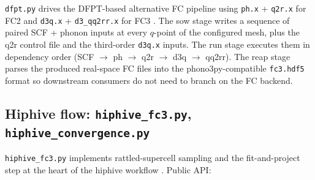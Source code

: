 \texttt{dfpt.py} drives the DFPT-based alternative FC pipeline using
\texttt{ph.x} + \texttt{q2r.x} for FC2 and \texttt{d3q.x} +
\texttt{d3\_qq2rr.x} for FC3 \cite{paulatto_anharmonic_2013,fugallo_ab_2013}.  The sow stage
writes a sequence of paired SCF + phonon inputs at every $q$-point of
the configured mesh, plus the q2r control file and the third-order
\texttt{d3q.x} inputs.  The run stage executes them in dependency
order (SCF $\to$ ph $\to$ q2r $\to$ d3q $\to$ qq2rr).  The reap stage
parses the produced real-space FC files into the phono3py-compatible
\texttt{fc3.hdf5} format so downstream consumers do not need to branch
on the FC backend.

\subsection{Hiphive flow: \texttt{hiphive\_fc3.py}, \texttt{hiphive\_convergence.py}}
\label{sec:hiphive_flow}

\texttt{hiphive\_fc3.py} implements rattled-supercell sampling and the
fit-and-project step at the heart of the hiphive workflow
\cite{eriksson_hiphive_2019}.  Public API:

